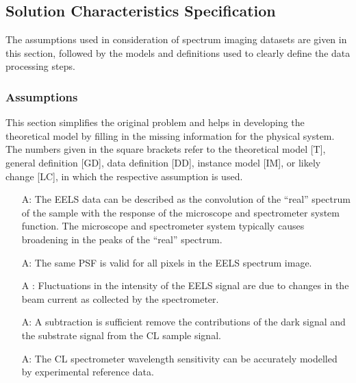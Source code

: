\documentclass[12pt]{article}
\newcounter{assumpnum} %
\begin{document}

\subsection{Solution Characteristics Specification}

The assumptions used in consideration of spectrum imaging datasets are given in
this section, followed by the models and definitions used to clearly define the
data processing steps.

\subsubsection{Assumptions}\label{sssec:Assumptions}

This section simplifies the original problem and helps in developing the
theoretical model by filling in the missing information for the physical
system. The numbers given in the square brackets refer to the theoretical model
[T], general definition [GD], data definition [DD], instance model [IM], or
likely change [LC], in which the respective assumption is used.

\begin{itemize}

	\item[A\refstepcounter{assumpnum}\theassumpnum \label{EELS_System_Response}:]
The EELS data can be described as the convolution of the ``real'' spectrum of
the sample with the response of the microscope and spectrometer system function.
The microscope and spectrometer system typically causes broadening in the peaks
of the ``real'' spectrum.
	
	\item[A\refstepcounter{assumpnum}\theassumpnum \label{EELS_PSF_variability}:]
The same PSF is valid for all pixels in the EELS spectrum image.
	
	\item[A\refstepcounter{assumpnum}\theassumpnum
\label{EELS_Intensity_Fluctuations}:] Fluctuations in the intensity of the EELS
signal are due to changes in the beam current as collected by the spectrometer.
	
	\item[A\refstepcounter{assumpnum}\theassumpnum \label{CL_Background}:] A
subtraction is sufficient  remove the contributions of the dark signal and the
substrate signal from the CL sample signal.
	
	\item[A\refstepcounter{assumpnum}\theassumpnum \label{CL_System_Response}:] The
CL spectrometer wavelength sensitivity can be accurately modelled by
experimental reference data.

\end{itemize}
\end{document}
